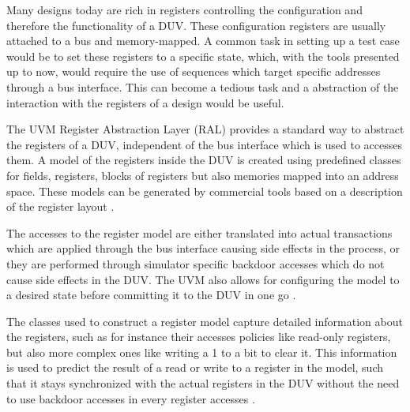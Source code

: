 \documentclass[11pt,a4paper]{report}
\begin{document}
Many designs today are rich in registers controlling the configuration and therefore the functionality of a DUV.
These configuration registers are usually attached to a bus and memory-mapped. A common task in setting up a test
case would be to set these registers to a specific state, which, with the tools presented up to now, would require
the use of sequences which target specific addresses through a bus interface. This can become a tedious task and a
abstraction of the interaction with the registers of a design would be useful.

The UVM Register Abstraction Layer (RAL) provides a standard way to abstract the registers of a DUV, independent of
the bus interface which is used to accesses them. A model of the registers inside the DUV is created using predefined
classes for fields, registers, blocks of registers but also memories mapped into an address space. These models can
be generated by commercial tools based on a description of the register layout \cite{uvm_ral}.

The accesses to the register model are either translated into actual transactions which are applied through the bus
interface causing side effects in the process, or they are performed through simulator specific backdoor accesses
which do not cause side effects in the DUV. The UVM also allows for configuring the model to a desired state before
committing it to the DUV in one go \cite{uvm_ral}.

The classes used to construct a register model capture detailed information about the registers, such as for instance
their accesses policies like read-only registers, but also more complex ones like writing a 1 to a bit to clear it.
This information is used to predict the result of a read or write to a register in the model, such that it stays
synchronized with the actual registers in the DUV without the need to use backdoor accesses in every register
accesses \cite{uvm_ral}.
\end{document}
